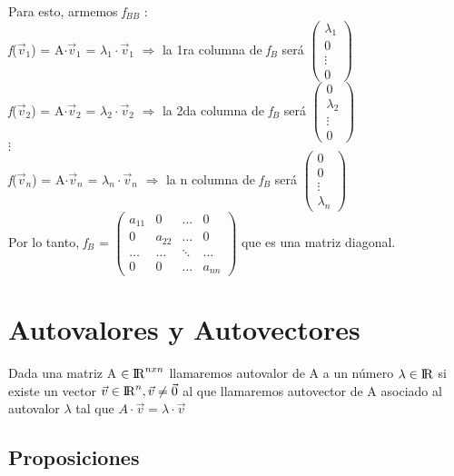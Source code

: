 \documentclass{article}
\begin{document}
Para esto, armemos \textbardbl \textit{f}\textbardbl $_{BB}$ :\\
\textit{f}($\vec{v}_{1}$) = A$\cdot\vec{v}_1$ = $\lambda_{1}\cdot\vec{v}_{1}$ $\Rightarrow$ la 1ra columna de \textbardbl \textit{f}\textbardbl $_{B}$ será $ \begin{pmatrix} \lambda_{1}\\ 0\\ \vdots\\ 0 \end{pmatrix}$\\
\textit{f}($\vec{v}_{2}$) = A$\cdot\vec{v}_2$ = $\lambda_{2}\cdot\vec{v}_{2}$ $\Rightarrow$ la 2da columna de \textbardbl \textit{f}\textbardbl $_{B}$ será $ \begin{pmatrix} 0 \\ \lambda_{2}\\ \vdots\\ 0 \end{pmatrix}$\\
$\vdots$\\
\textit{f}($\vec{v}_{n}$) = A$\cdot\vec{v}_n$ = $\lambda_{n}\cdot\vec{v}_{n}$ $\Rightarrow$ la n columna de \textbardbl \textit{f}\textbardbl $_{B}$ será $ \begin{pmatrix} 0 \\ 0\\ \vdots\\ \lambda_n \end{pmatrix}$\\
Por lo tanto, \textbardbl \textit{f}\textbardbl $_{B}$ = $ \begin{pmatrix} a_{11}&0&\ldots&0\\ 0&a_{22}&\ldots&0\\ \ldots&\ldots&\ddots&\ldots\\ 0&0&\ldots&a_{nn} \end{pmatrix}$ que es una matriz diagonal. \\
\newpage
\section{Autovalores y Autovectores}
Dada una matriz A $\in {\rm I\!R}^{nxn}$ llamaremos autovalor de A a un número $\lambda \in {\rm I\!R}$ si existe un vector $\vec{v} \in {\rm I\!R}^n, \vec{v} \neq \vec{0}$ al que llamaremos autovector de A asociado al autovalor $\lambda$ tal que $A\cdot\vec{v} = \lambda\cdot\vec{v}$
\subsection{Proposiciones}
\end{document}
